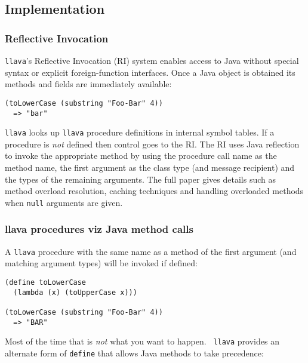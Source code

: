 \documentclass{acm-final/sig-alternate-modified}
\begin{document}
\subsection{Implementation}

\subsubsection{Reflective Invocation}

{\tt llava}'s Reflective Invocation (RI) system enables access to Java
without special syntax or explicit foreign-function interfaces.  Once
a Java object is obtained its methods and fields are immediately
available:

\small
\begin{verbatim}
(toLowerCase (substring "Foo-Bar" 4))
  => "bar"
\end{verbatim}
\normalsize

{\tt llava} looks up {\tt llava} procedure definitions in internal
symbol tables.  If a procedure is \emph{not} defined then control goes
to the RI.  The RI uses Java reflection to invoke the appropriate
method by using the procedure call name as the method name, the first
argument as the class type (and message recipient) and the types of
the remaining arguments.  The full paper gives details such as method
overload resolution, caching techniques and handling overloaded
methods when {\tt null} arguments are given.

\subsubsection{llava procedures viz Java method calls}

A {\tt llava} procedure with the same name as a method of the first
argument (and matching argument types) will be invoked if defined:

\small
\begin{verbatim}
(define toLowerCase
  (lambda (x) (toUpperCase x)))

(toLowerCase (substring "Foo-Bar" 4))
  => "BAR"
\end{verbatim}
\normalsize

Most of the time that is \emph{not} what you want to happen.  {\tt
llava} provides an alternate form of {\tt define} that allows Java
methods to take precedence:
\end{document}
